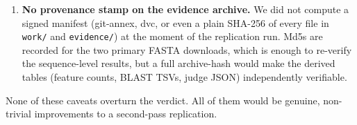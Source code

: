 \documentclass[11pt]{article}
\begin{document}
\begin{enumerate}
\item \textbf{No provenance stamp on the evidence archive.}
We did not compute a signed manifest (git-annex, dvc, or even a plain SHA-256 of every file in \texttt{work/} and \texttt{evidence/}) at the moment of the replication run. Md5s are recorded for the two primary FASTA downloads, which is enough to re-verify the sequence-level results, but a full archive-hash would make the derived tables (feature counts, BLAST TSVs, judge JSON) independently verifiable.

\end{enumerate}

None of these caveats overturn the verdict. All of them would be genuine, non-trivial improvements to a second-pass replication.
\end{document}
